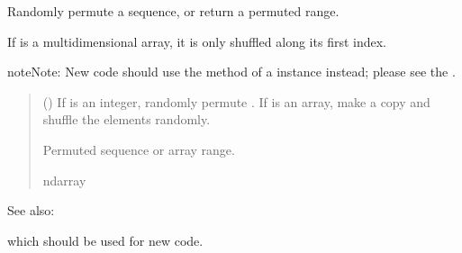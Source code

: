 \documentclass[letterpaper,10pt,english]{sphinxmanual}
\begin{document}
\begin{fulllineitems}
\end{fulllineitems}


\begin{fulllineitems}
\label{\detokenize{metilda.controllers:metilda.controllers.pitch_art_wizard.permutation}}
\pysigstartsignatures
{}
\pysigstopsignatures
\sphinxAtStartPar
Randomly permute a sequence, or return a permuted range.

\sphinxAtStartPar
If  is a multi\sphinxhyphen{}dimensional array, it is only shuffled along its
first index.

\begin{sphinxadmonition}{note}{Note:}
\sphinxAtStartPar
New code should use the
method of a  instance instead;
please see the .
\end{sphinxadmonition}
\begin{quote}\begin{description}
\sphinxAtStartPar
{} () \textendash{} If  is an integer, randomly permute .
If  is an array, make a copy and shuffle the elements
randomly.

\sphinxAtStartPar
{} \textendash{} Permuted sequence or array range.

\sphinxAtStartPar
ndarray

\end{description}\end{quote}


\begin{sphinxseealso}{See also:}
\begin{description}
\sphinxAtStartPar
which should be used for new code.


\end{description}
\end{sphinxseealso}
\end{fulllineitems}
\end{document}
